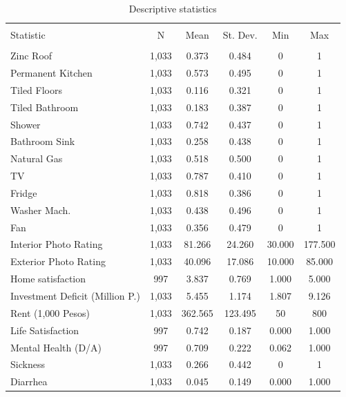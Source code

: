 
\begin{table}[H] \centering 
  \caption{Descriptive statistics} 
  \label{} 
\footnotesize 
\begin{tabular}{@{\extracolsep{-7pt}}lccccc} 
\\[-1.8ex]\hline 
\hline \\[-1.8ex] 
Statistic & \multicolumn{1}{c}{N} & \multicolumn{1}{c}{Mean} & \multicolumn{1}{c}{St. Dev.} & \multicolumn{1}{c}{Min} & \multicolumn{1}{c}{Max} \\ 
\hline \\[-1.8ex] 
Zinc Roof & 1,033 & 0.373 & 0.484 & 0 & 1 \\ 
Permanent Kitchen & 1,033 & 0.573 & 0.495 & 0 & 1 \\ 
Tiled Floors & 1,033 & 0.116 & 0.321 & 0 & 1 \\ 
Tiled Bathroom & 1,033 & 0.183 & 0.387 & 0 & 1 \\ 
Shower & 1,033 & 0.742 & 0.437 & 0 & 1 \\ 
Bathroom Sink & 1,033 & 0.258 & 0.438 & 0 & 1 \\ 
Natural Gas & 1,033 & 0.518 & 0.500 & 0 & 1 \\ 
TV & 1,033 & 0.787 & 0.410 & 0 & 1 \\ 
Fridge & 1,033 & 0.818 & 0.386 & 0 & 1 \\ 
Washer Mach. & 1,033 & 0.438 & 0.496 & 0 & 1 \\ 
Fan & 1,033 & 0.356 & 0.479 & 0 & 1 \\ 
Interior Photo Rating & 1,033 & 81.266 & 24.260 & 30.000 & 177.500 \\ 
Exterior Photo Rating & 1,033 & 40.096 & 17.086 & 10.000 & 85.000 \\ 
Home satisfaction & 997 & 3.837 & 0.769 & 1.000 & 5.000 \\ 
Investment Deficit (Million P.) & 1,033 & 5.455 & 1.174 & 1.807 & 9.126 \\ 
Rent (1,000 Pesos) & 1,033 & 362.565 & 123.495 & 50 & 800 \\ 
Life Satisfaction & 997 & 0.742 & 0.187 & 0.000 & 1.000 \\ 
Mental Health (D/A) & 997 & 0.709 & 0.222 & 0.062 & 1.000 \\ 
Sickness & 1,033 & 0.266 & 0.442 & 0 & 1 \\ 
Diarrhea & 1,033 & 0.045 & 0.149 & 0.000 & 1.000 \\ 

\end{tabular}
\end{table}
